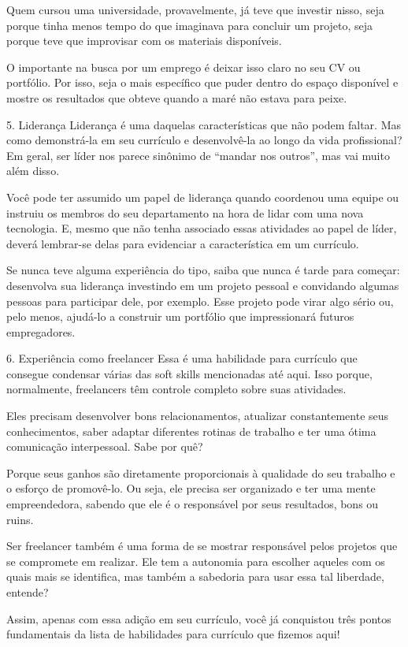 \begin{commentA}
Quem cursou uma universidade, provavelmente, já teve que investir nisso, seja porque tinha menos tempo do que imaginava para concluir um projeto, seja porque teve que improvisar com os materiais disponíveis.

O importante na busca por um emprego é deixar isso claro no seu CV ou portfólio. Por isso, seja o mais específico que puder dentro do espaço disponível e mostre os resultados que obteve quando a maré não estava para peixe.

5. Liderança
Liderança é uma daquelas características que não podem faltar. Mas como demonstrá-la em seu currículo e desenvolvê-la ao longo da vida profissional? Em geral, ser líder nos parece sinônimo de “mandar nos outros”, mas vai muito além disso.

Você pode ter assumido um papel de liderança quando coordenou uma equipe ou instruiu os membros do seu departamento na hora de lidar com uma nova tecnologia. E, mesmo que não tenha associado essas atividades ao papel de líder, deverá lembrar-se delas para evidenciar a característica em um currículo.

Se nunca teve alguma experiência do tipo, saiba que nunca é tarde para começar: desenvolva sua liderança investindo em um projeto pessoal e convidando algumas pessoas para participar dele, por exemplo. Esse projeto pode virar algo sério ou, pelo menos, ajudá-lo a construir um portfólio que impressionará futuros empregadores.

6. Experiência como freelancer
Essa é uma habilidade para currículo que consegue condensar várias das soft skills mencionadas até aqui. Isso porque, normalmente, freelancers têm controle completo sobre suas atividades.

Eles precisam desenvolver bons relacionamentos, atualizar constantemente seus conhecimentos, saber adaptar diferentes rotinas de trabalho e ter uma ótima comunicação interpessoal. Sabe por quê?

Porque seus ganhos são diretamente proporcionais à qualidade do seu trabalho e o esforço de promovê-lo. Ou seja, ele precisa ser organizado e ter uma mente empreendedora, sabendo que ele é o responsável por seus resultados, bons ou ruins.

Ser freelancer também é uma forma de se mostrar responsável pelos projetos que se compromete em realizar. Ele tem a autonomia para escolher aqueles com os quais mais se identifica, mas também a sabedoria para usar essa tal liberdade, entende?

Assim, apenas com essa adição em seu currículo, você já conquistou três pontos fundamentais da lista de habilidades para currículo que fizemos aqui!


\end{commentA}
